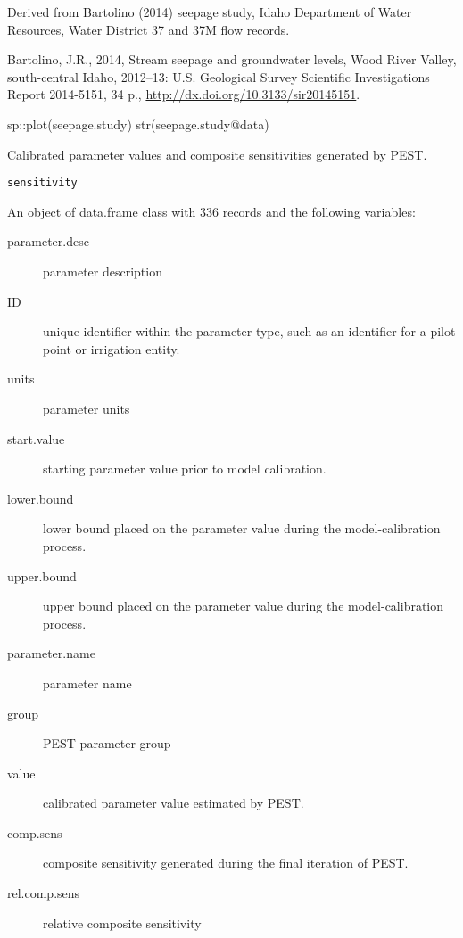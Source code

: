 \documentclass[a4paper]{book}
\begin{document}
%
\begin{Source}\relax
Derived from Bartolino (2014) seepage study,
Idaho Department of Water Resources, Water District 37 and 37M flow records.
\end{Source}
%
\begin{References}\relax
Bartolino, J.R., 2014, Stream seepage and groundwater levels, Wood River Valley,
south-central Idaho, 2012--13: U.S. Geological Survey Scientific Investigations Report 2014-5151,
34 p., \url{http://dx.doi.org/10.3133/sir20145151}.
\end{References}
%
\begin{Examples}
\begin{ExampleCode}
sp::plot(seepage.study)
str(seepage.study@data)

\end{ExampleCode}
\end{Examples}
%
\begin{Description}\relax
Calibrated parameter values and composite sensitivities generated by PEST.
\end{Description}
%
\begin{Usage}
\begin{verbatim}
sensitivity
\end{verbatim}
\end{Usage}
%
\begin{Format}
An object of data.frame class with 336 records and the following variables:
\begin{description}

\item[parameter.desc] parameter description
\item[ID] unique identifier within the parameter type,
such as an identifier for a pilot point or irrigation entity.
\item[units] parameter units
\item[start.value] starting parameter value prior to model calibration.
\item[lower.bound] lower bound placed on the parameter value
during the model-calibration process.
\item[upper.bound] upper bound placed on the parameter value
during the model-calibration process.
\item[parameter.name]  parameter name
\item[group] PEST parameter group
\item[value] calibrated parameter value estimated by PEST.
\item[comp.sens] composite sensitivity generated during the final iteration of PEST.
\item[rel.comp.sens] relative composite sensitivity

\end{description}
\end{Format}
\end{document}
